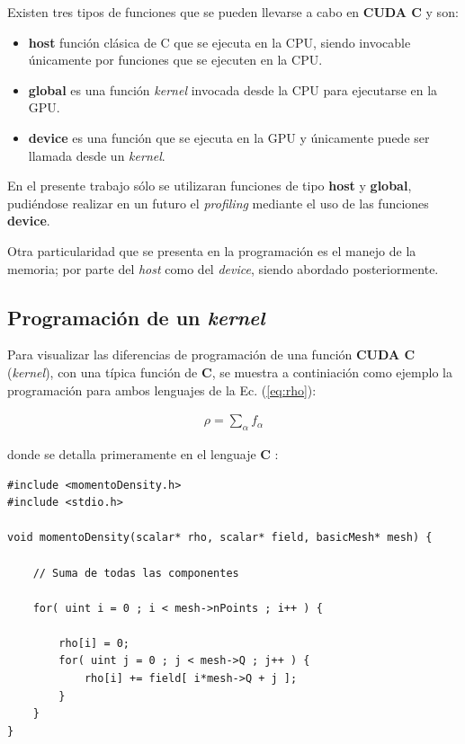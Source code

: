 Existen tres tipos de funciones que se pueden llevarse a cabo en \textbf{CUDA C} y son:

\begin{itemize}
	
	\item \textbf{host} función clásica de C que se ejecuta en la CPU, siendo invocable únicamente por funciones que se ejecuten en la CPU. 

	\item \textbf{global} es una función \textit{kernel} invocada desde la CPU para ejecutarse en la GPU. 
	
	\item \textbf{device} es una función que se ejecuta en la GPU y únicamente puede ser llamada desde un \textit{kernel}.
	
\end{itemize}

En el presente trabajo sólo se utilizaran funciones de tipo \textbf{host} y \textbf{global}, pudiéndose realizar en un futuro el  \textit{profiling} mediante el uso de las funciones \textbf{device}.

Otra particularidad que se presenta en la programación es el manejo de la memoria; por parte del \textit{host} como del \textit{device}, siendo abordado posteriormente.
\newpage

\subsection{Programación de un \textit{kernel}}

Para visualizar las diferencias de programación de una función \textbf{CUDA C } (\textit{kernel}), con una típica función de \textbf{C}, se muestra a continiación como ejemplo la programación para ambos lenguajes de la Ec. (\ref{eq:rho}): 

\begin{align*}
	\rho = \sum_{\alpha} f_{\alpha}
\end{align*}

donde se detalla primeramente en el lenguaje \textbf{C} :

{\footnotesize
	\begin{frame}{}
		\begin{lstlisting}[frame=single]
#include <momentoDensity.h>
#include <stdio.h>

void momentoDensity(scalar* rho, scalar* field, basicMesh* mesh) {
	
	// Suma de todas las componentes
	
	for( uint i = 0 ; i < mesh->nPoints ; i++ ) {
		
		rho[i] = 0;	    
		for( uint j = 0 ; j < mesh->Q ; j++ ) {
			rho[i] += field[ i*mesh->Q + j ];
		}		
	}
}
		\end{lstlisting}
		
	\end{frame}
}

